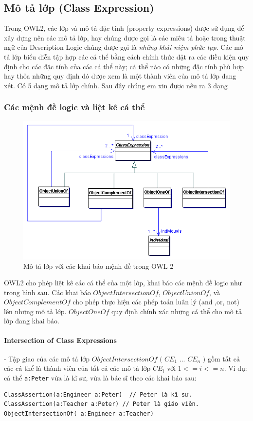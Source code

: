 \subsection{Mô tả lớp (Class Expression)}
Trong OWL2, các lớp và mô tả đặc tính (property expressions) được sử dụng để xây dựng nên các mô tả lớp, hay chúng được gọi là các miêu tả hoặc trong thuật ngữ của Description Logic chúng được gọi là \textit{những khái niệm phức tạp}. Các mô tả lớp 
biểu diễn tập hợp các cá thể bằng cách chính thức đặt ra các điều kiện quy định cho các đặc tính của các cá thể này; cá thể nào có những đặc tính phù hợp hay thỏa những quy định đó được xem là một thành viên của mô tả lớp đang xét. Có 5 dạng mô tả lớp chính. Sau đây chúng em xin được nêu ra 3 dạng 
\subsubsection{Các mệnh đề logic và liệt kê cá thể}
\begin{figure}[h]
	\centering
	\includegraphics[width=120mm]{Figures/ce_0.png}
	\caption{Mô tả lớp với các khai báo mệnh đề trong OWL 2\label{overflow}}
\end{figure}
OWL2 cho phép liệt kê các cá thể của một lớp, khai báo các mệnh đề logic như trong hình sau. Các khai báo $ObjectIntersectionOf$, $ObjectUnionOf$, và $ObjectComplementOf$ cho phép thực hiện các phép toán luân lý (and ,or, not) lên những mô tả lớp. $ObjectOneOf$ quy định chính xác những cá thể cho mô tả lớp đang khai báo.
\paragraph{Intersection of Class Expressions} - Tập giao của các mô tả lớp $ObjectIntersectionOf$ $($ $CE_{1}$ ... $CE_{n}$ $)$ gồm tất cả các cá thể là thành viên của tất cả các mô tả lớp $CE_{i}$ với $1<=i<=n$. Ví dụ: cá thể \verb|a:Peter| vừa là kĩ sư, vừa là bác sĩ theo các khai báo sau:
\begin{verbatim}
ClassAssertion(a:Engineer a:Peter)  // Peter là kĩ sư.
ClassAssertion(a:Teacher a:Peter) // Peter là giáo viên.
ObjectIntersectionOf( a:Engineer a:Teacher)
\end{verbatim}

